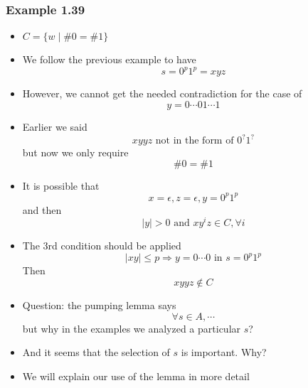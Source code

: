 \begin{frame}[allowframebreaks] \frametitle{Example 1.39}
  \begin{itemize}
\item $C=\{w \mid \#0 = \#1\}$
\item We follow the previous example to have
  \begin{equation*}
  s=0^p 1^p=xyz
\end{equation*}
\item However, we cannot get the needed contradiction for the case
  of
  \begin{equation*}
    y = 0 \cdots 0 1 \cdots 1
  \end{equation*}
\item Earlier we said
  \begin{equation*}
    xyyz \text{ not in the form of } 0^? 1^?
  \end{equation*}
but now we only require
\begin{equation*}
  \# 0 = \# 1
\end{equation*}
\item It is possible that 
  \begin{equation*}
x=\epsilon, z=\epsilon, y = 0^p 1^p 
\end{equation*}
and then
\begin{equation*}
|y| > 0 \text{ and } xy^i z\in C, \forall i
\end{equation*}

\item The 3rd condition should be applied
  \begin{equation*}
|xy| \leq p \Rightarrow y = 0 \cdots 0 \text{ in } s = 0^p 1^p
\end{equation*}
Then 
\begin{equation*}
xyyz \notin C
\end{equation*}
\item Question: the pumping lemma says
  \begin{equation*}
    \forall s \in A, \cdots
  \end{equation*}
  but why in the examples we analyzed a \alert{particular $s$}?
\item And it seems that the selection of $s$ is important. Why?

\item We will explain our use of the lemma in more detail
\end{itemize}\end{frame}



